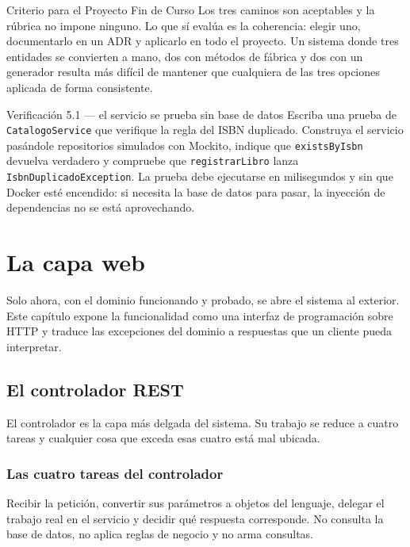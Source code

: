 \documentclass[11pt,a4paper,openany]{book}
\begin{document}
\begin{cajabuenas}{Criterio para el Proyecto Fin de Curso}
	Los tres caminos son aceptables y la rúbrica no impone ninguno. Lo que sí evalúa es la coherencia: elegir uno, documentarlo en un ADR y aplicarlo en todo el proyecto. Un sistema donde tres entidades se convierten a mano, dos con métodos de fábrica y dos con un generador resulta más difícil de mantener que cualquiera de las tres opciones aplicada de forma consistente.
\end{cajabuenas}

\begin{cajaejercicio}{Verificación 5.1 --- el servicio se prueba sin base de datos}
	Escriba una prueba de \texttt{CatalogoService} que verifique la regla del ISBN duplicado. Construya el servicio pasándole repositorios simulados con Mockito, indique que \texttt{existsByIsbn} devuelva verdadero y compruebe que \texttt{registrarLibro} lanza \texttt{IsbnDuplicadoException}. La prueba debe ejecutarse en milisegundos y sin que Docker esté encendido: si necesita la base de datos para pasar, la inyección de dependencias no se está aprovechando.
\end{cajaejercicio}

\chapter{La capa web}
\label{cap:web}

Solo ahora, con el dominio funcionando y probado, se abre el sistema al exterior. Este capítulo expone la funcionalidad como una interfaz de programación sobre HTTP y traduce las excepciones del dominio a respuestas que un cliente pueda interpretar.

\section{El controlador REST}
\label{sec:controlador}

El controlador es la capa más delgada del sistema. Su trabajo se reduce a cuatro tareas y cualquier cosa que exceda esas cuatro está mal ubicada.

\subsection{Las cuatro tareas del controlador}
\label{sec:tareas-controlador}

Recibir la petición, convertir sus parámetros a objetos del lenguaje, delegar el trabajo real en el servicio y decidir qué respuesta corresponde. No consulta la base de datos, no aplica reglas de negocio y no arma consultas.
\end{document}
